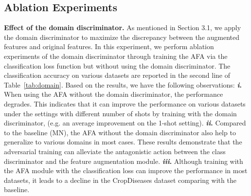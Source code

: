 \documentclass[runningheads]{utils/llncs}
\begin{document}
\subsection{Ablation Experiments}
\textbf{Effect of the domain discriminator.} 
As mentioned in Section 3.1, we apply the domain discriminator to maximize the discrepancy between the augmented features and original features. 
In this experiment, we perform ablation experiments of the domain discriminator through training the AFA via the classification loss function  but without using the domain discriminator. 
The classification accuracy on various datasets are reported in the second line of Table~\ref{tab:domain}. 
Based on the results, we have the following observations:
\textbf{\emph{i}.}
When using the AFA without the domain discriminator, the performance degrades. 
This indicates that it can improve the performance on various datasets under the settings with different number of shots by training with the domain discriminator,  (e.g. an average  improvement on the 1-shot setting).
\textbf{\emph{ii}.}
Compared to the baseline (MN), the AFA without the domain discriminator also help to generalize to various domains in most cases. 
These results demonstrate that the adversarial training can alleviate the antagonistic action between the class discriminator and the feature augmentation module.
\textbf{\emph{iii}.}
Although training with the AFA module with the classification loss can improve the performance in most datasets, it leads to a decline in the CropDiseases dataset comparing with the baseline.
\end{document}
